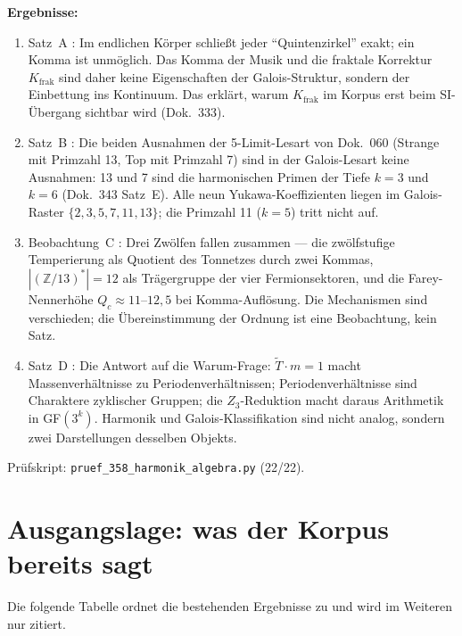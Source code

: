 \textbf{Ergebnisse:}
\begin{enumerate}
\item Satz~A \BM: Im endlichen Körper schließt jeder ``Quintenzirkel''
  exakt; ein Komma ist unmöglich. Das Komma der Musik und die fraktale
  Korrektur $K_\text{frak}$ sind daher keine Eigenschaften der
  Galois-Struktur, sondern der Einbettung ins Kontinuum. Das erklärt,
  warum $K_\text{frak}$ im Korpus erst beim SI-Übergang sichtbar wird
  (Dok.~333).
\item Satz~B \BM: Die beiden Ausnahmen der 5-Limit-Lesart von Dok.~060
  (Strange mit Primzahl 13, Top mit Primzahl 7) sind in der Galois-Lesart
  keine Ausnahmen: 13 und 7 sind die harmonischen Primen der Tiefe $k=3$
  und $k=6$ (Dok.~343 Satz~E). Alle neun Yukawa-Koeffizienten liegen im
  Galois-Raster $\{2,3,5,7,11,13\}$; die Primzahl 11 ($k=5$) tritt nicht auf.
\item Beobachtung~C \SM: Drei Zwölfen fallen zusammen --- die
  zwölfstufige Temperierung als Quotient des Tonnetzes durch zwei Kommas,
  $|(\mathbb{Z}/13)^*|=12$ als Trägergruppe der vier Fermionsektoren,
  und die Farey-Nennerhöhe $Q_c\approx11$--$12{,}5$ bei Komma-Auflösung.
  Die Mechanismen sind verschieden; die Übereinstimmung der Ordnung ist
  eine Beobachtung, kein Satz.
\item Satz~D \BM: Die Antwort auf die Warum-Frage: $\tilde{T}\cdot m=1$
  macht Massenverhältnisse zu Periodenverhältnissen; Periodenverhältnisse
  sind Charaktere zyklischer Gruppen; die $Z_3$-Reduktion macht daraus
  Arithmetik in GF$(3^k)$. Harmonik und Galois-Klassifikation sind nicht
  analog, sondern zwei Darstellungen desselben Objekts.
\end{enumerate}

Prüfskript: \texttt{pruef\_358\_harmonik\_algebra.py} (22/22).

\section{Ausgangslage: was der Korpus bereits sagt}

Die folgende Tabelle ordnet die bestehenden Ergebnisse zu und wird im
Weiteren nur zitiert.

